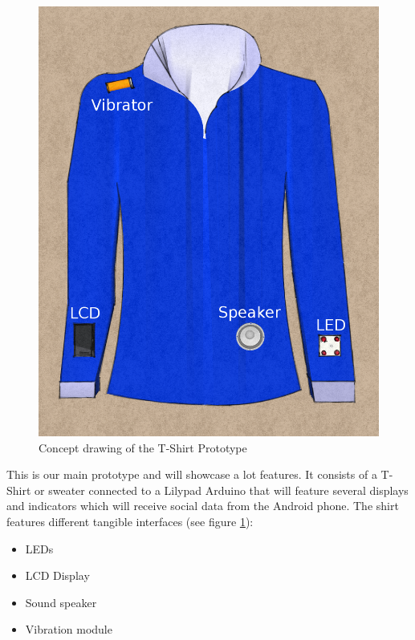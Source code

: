 \begin{figure}
\vspace{-20pt}
\begin{center}
\includegraphics[scale=0.2]{img/design-tshirtproto}
\end{center}
\vspace{-10pt}
\caption{Concept drawing of the T-Shirt Prototype}
\label{fig:design-TShirt}
\vspace{-50pt}
\end{figure}
	
This is our main prototype and will showcase a lot features.
It consists of a T-Shirt or sweater connected to a Lilypad Arduino that will feature
several displays and indicators which will receive social data from the Android phone.
The shirt features different tangible interfaces (see figure \ref{fig:design-TShirt}):
	
\begin{itemize}
\item LEDs
\item LCD Display
\item Sound speaker
\item Vibration module
\end{itemize}
	
